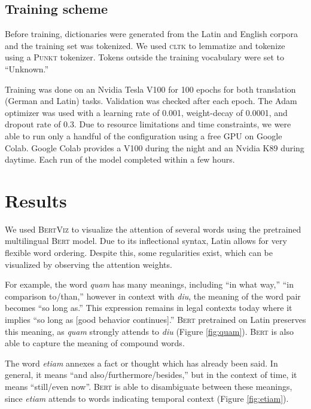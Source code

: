 \documentclass[11pt,a4paper]{article}
\begin{document}
\subsection{Training scheme}

Before training, dictionaries were generated from the Latin and English corpora
and the training set was tokenized.
We used \textsc{cltk} to lemmatize and tokenize using a \textsc{Punkt} tokenizer.
Tokens outside the training vocabulary were set to ``Unknown.''

Training was done on an Nvidia Tesla V100 for 100 epochs for both translation (German and Latin) tasks.
Validation was checked after each epoch.
The Adam optimizer was used with a learning rate of 0.001, weight-decay of 0.0001,
and dropout rate of 0.3.
Due to resource limitations and time constraints, we were able to run only a handful of the configuration using a free GPU on Google Colab.
Google Colab provides a V100 during the night and an Nvidia K89 during daytime.
Each run of the model completed within a few hours.


\section{Results}

We used \textsc{BertViz} to visualize the attention of several words using the pretrained multilingual \textsc{Bert} model.
Due to its inflectional syntax, Latin allows for very flexible word ordering.
Despite this, some regularities exist, which can be visualized by observing the attention weights.

For example, the word \textit{quam} has many meanings, including ``in what way,'' ``in comparison to/than,'' however in context with \textit{diu}, the meaning of the word pair becomes ``so long as.''
This expression remains in legal contexts today where it implies ``so long as [good behavior continues].''
\textsc{Bert} pretrained on Latin preserves this meaning, as \textit{quam} strongly attends to \textit{diu} (Figure \ref{fig:quam}).
\textsc{Bert} is also able to capture the meaning of compound words.

The word \textit{etiam} annexes a fact or thought which has already been said.
In general, it means ``and also/furthermore/besides,''
but in the context of time, it means ``still/even now''. 
\textsc{Bert} is able to disambiguate between these meanings,
since \textit{etiam} attends to words indicating temporal context (Figure \ref{fig:etiam}).
\end{document}
